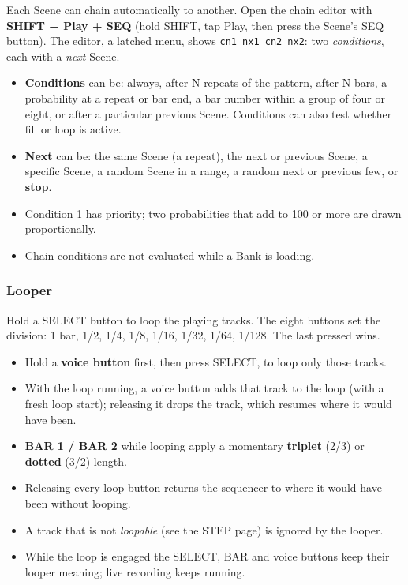 Each Scene can chain automatically to another. Open the chain editor
with \textbf{SHIFT + Play + SEQ} (hold SHIFT, tap Play, then press the
Scene's SEQ button). The editor, a latched menu, shows
\texttt{cn1\ nx1\ cn2\ nx2}: two \emph{conditions}, each with a
\emph{next} Scene.

\begin{itemize}
\tightlist
\item
  \textbf{Conditions} can be: always, after N repeats of the pattern,
  after N bars, a probability at a repeat or bar end, a bar number
  within a group of four or eight, or after a particular previous Scene.
  Conditions can also test whether fill or loop is active.
\item
  \textbf{Next} can be: the same Scene (a repeat), the next or previous
  Scene, a specific Scene, a random Scene in a range, a random next or
  previous few, or \textbf{stop}.
\item
  Condition 1 has priority; two probabilities that add to 100 or more
  are drawn proportionally.
\item
  Chain conditions are not evaluated while a Bank is loading.
\end{itemize}


\subsubsection{Looper}\label{looper}

Hold a SELECT button to loop the playing tracks. The eight buttons set
the division: 1 bar, 1/2, 1/4, 1/8, 1/16, 1/32, 1/64, 1/128. The last
pressed wins.

\begin{itemize}
\tightlist
\item
  Hold a \textbf{voice button} first, then press SELECT, to loop only
  those tracks.
\item
  With the loop running, a voice button adds that track to the loop
  (with a fresh loop start); releasing it drops the track, which resumes
  where it would have been.
\item
  \textbf{BAR 1 / BAR 2} while looping apply a momentary
  \textbf{triplet} (2/3) or \textbf{dotted} (3/2) length.
\item
  Releasing every loop button returns the sequencer to where it would
  have been without looping.
\item
  A track that is not \emph{loopable} (see the STEP page) is ignored by
  the looper.
\item
  While the loop is engaged the SELECT, BAR and voice buttons keep their
  looper meaning; live recording keeps running.
\end{itemize}

